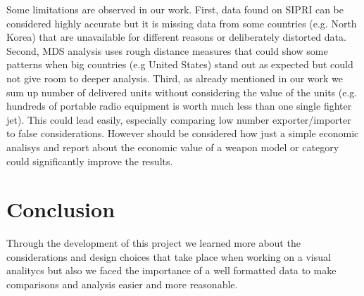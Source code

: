 \documentclass{article}
\begin{document}
\begin{multicols}{2}
Some limitations are observed in our work. First, data found on SIPRI can be considered highly accurate but it is missing data from some countries (e.g. North Korea) that are unavailable for different reasons or deliberately distorted data. Second, MDS analysis uses rough distance measures that could show some patterns when big countries (e.g United States) stand out as expected but could not  give room to deeper analysis.
Third, as already mentioned in our work we sum up number of delivered units without considering the value of the units (e.g. hundreds of portable radio equipment is worth much less than one single fighter jet). This could lead easily, especially comparing low number exporter/importer to false considerations. However should be considered how just a simple economic analisys and report about the economic value of a weapon model or category could significantly improve the results.




\section{Conclusion}
Through the development of this project we learned more about the considerations and design choices that take place when working on a visual analitycs but also we faced the importance of a well formatted data to make comparisons and analysis easier and more reasonable.

\end{multicols}

\end{document}

